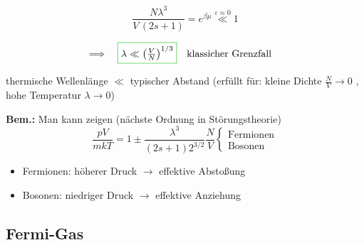 \begin{equation}
    \frac{N\lambda^3}{V \, (2s+1)} = e^{\beta \mu} \overset{\varepsilon \approx 0}{\ll} 1
\end{equation}

\begin{equation}
    \Longrightarrow \quad \fcolorbox{green!70!black}{white}{$\lambda \ll \left(\frac{V}{N}\right)^{1/3}$} \qq{klassicher Grenzfall}
\end{equation}

thermische Wellenlänge $\ll$ typischer Abstand  (erfüllt für: kleine Dichte $\frac{N}{V} \rightarrow 0$ , hohe Temperatur $\lambda \rightarrow 0$)

\textbf{Bem.:} Man kann zeigen (nächste Ordnung in Störungstheorie)
\begin{equation}
    \frac{pV}{mkT} = 1 \pm \frac{\lambda^3}{(2s+1) 2^{3/2}} \frac{N}{V} \begin{cases}
        \text{Fermionen}\\ \text{Bosonen}
    \end{cases}
\end{equation}

\begin{itemize}
    \item Fermionen:  höherer Druck $\rightarrow$ effektive Abstoßung
    \item Bosonen:  niedriger Druck $\rightarrow$ effektive Anziehung
\end{itemize}

\subsection{Fermi-Gas}

